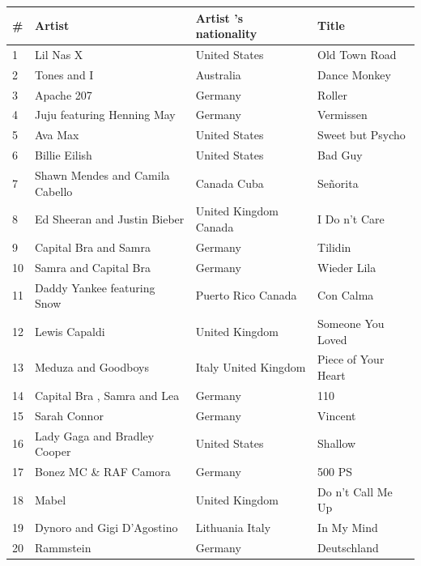 \documentclass{article}
\begin{document}
\begin{tabular}{llll}
\toprule
\# & Artist & Artist 's nationality & Title \\
\midrule
1 & Lil Nas X & United States & Old Town Road \\
2 & Tones and I & Australia & Dance Monkey \\
3 & Apache 207 & Germany & Roller \\
4 & Juju featuring Henning May & Germany & Vermissen \\
5 & Ava Max & United States & Sweet but Psycho \\
6 & Billie Eilish & United States & Bad Guy \\
7 & Shawn Mendes and Camila Cabello & Canada Cuba & Señorita \\
8 & Ed Sheeran and Justin Bieber & United Kingdom Canada & I Do n't Care \\
9 & Capital Bra and Samra & Germany & Tilidin \\
10 & Samra and Capital Bra & Germany & Wieder Lila \\
11 & Daddy Yankee featuring Snow & Puerto Rico Canada & Con Calma \\
12 & Lewis Capaldi & United Kingdom & Someone You Loved \\
13 & Meduza and Goodboys & Italy United Kingdom & Piece of Your Heart \\
14 & Capital Bra , Samra and Lea & Germany & 110 \\
15 & Sarah Connor & Germany & Vincent \\
16 & Lady Gaga and Bradley Cooper & United States & Shallow \\
17 & Bonez MC \& RAF Camora & Germany & 500 PS \\
18 & Mabel & United Kingdom & Do n't Call Me Up \\
19 & Dynoro and Gigi D'Agostino & Lithuania Italy & In My Mind \\
20 & Rammstein & Germany & Deutschland \\
\bottomrule
\end{tabular}
\end{document}
